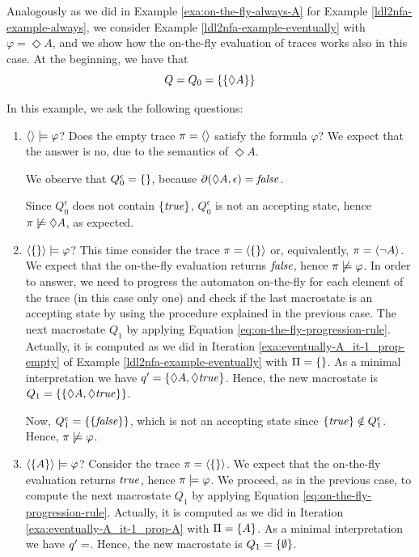 \begin{example}\label{exa:on-the-fly-eventually-A}
	Analogously as we did in Example \ref{exa:on-the-fly-always-A} for Example \ref{ldl2nfa-example-always}, we consider Example \ref{ldl2nfa-example-eventually} with $\varphi = \Diamond A$, and we show how the on-the-fly evaluation of traces works also in this case.
	At the beginning, we have that $$Q = Q_0 = \{\{\Diamond A\}\}$$
	
	In this example, we ask the following questions:
	\begin{enumerate}
		\item $\langle  \rangle \models \varphi$? Does the empty trace $\pi = \langle  \rangle$ satisfy the formula $\varphi$? We expect that the answer is no, due to the semantics of $\Diamond A$. 
		
		We observe that $Q_0^\epsilon = \{\}$,
		because $\partial\lparen \Diamond A, \epsilon\rparen = \mathit{false}$.
		
		Since $Q_0^\epsilon$ does not contain $\{\mathit{true}\}$, $Q_0^\epsilon$ is not an accepting state, hence $\pi \not\models \Diamond A$, as expected.
		
		\item $\langle \{\} \rangle \models \varphi$? This time consider the trace $\pi = \langle \{\} \rangle$ or, equivalently, $\pi = \langle \lnot A \rangle$. We expect that the on-the-fly evaluation returns $\mathit{false}$, hence $\pi \not \models \varphi$. In order to answer, we need to progress the automaton on-the-fly for each element of the trace (in this case only one) and check if the last macrostate is an accepting state by using the procedure explained in the previous case.
		The next macrostate $Q_1$ by applying Equation \ref{eq:on-the-fly-progression-rule}. Actually, it is computed as we did in Iteration \ref{exa:eventually-A_it-1_prop-empty} of Example \ref{ldl2nfa-example-eventually} with $\Pi = \{\}$. 
		 As a minimal interpretation we have $q' = \{\Diamond A, \Diamond \mathit{true}\}$. Hence, the new macrostate is $Q_1 = \{\{\Diamond A, \Diamond \mathit{true}\}\}$.
		 
		Now, $Q_1^\epsilon = \{\{\mathit{false}\}\}$, which is not an accepting state since $\{\mathit{true}\} \notin Q_1^\epsilon$. Hence, $\pi \not \models \varphi$.\label{exa:on-the-fly-eventually-A-trace-false}
		
		\item $\langle \{A\} \rangle \models \varphi$? Consider the trace $\pi = \langle \{\} \rangle$. We expect that the on-the-fly evaluation returns $\mathit{true}$, hence $\pi \models \varphi$. We proceed, as in the previous case, to compute the next macrostate $Q_1$ by applying Equation \ref{eq:on-the-fly-progression-rule}. Actually, it is computed as we did in Iteration \ref{exa:eventually-A_it-1_prop-A} with $\Pi = \{A\}$. As a minimal interpretation we have $q' = \empty$. Hence, the new macrostate is $Q_1 = \{\emptyset\}$.
		

\end{enumerate}
\end{example}
